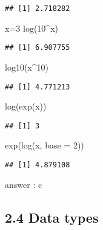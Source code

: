 \documentclass[
]{article}
\newenvironment{Shaded}{\begin{snugshade}}{\end{snugshade}}
\newcommand{\AttributeTok}[1]{\textcolor[rgb]{0.77,0.63,0.00}{#1}}
\newcommand{\DecValTok}[1]{\textcolor[rgb]{0.00,0.00,0.81}{#1}}
\newcommand{\FunctionTok}[1]{\textcolor[rgb]{0.00,0.00,0.00}{#1}}
\newcommand{\NormalTok}[1]{#1}
\newcommand{\OtherTok}[1]{\textcolor[rgb]{0.56,0.35,0.01}{#1}}
\newcommand{\SpecialCharTok}[1]{\textcolor[rgb]{0.00,0.00,0.00}{#1}}
\begin{document}
\begin{verbatim}
## [1] 2.718282
\end{verbatim}

\begin{Shaded}
\begin{Highlighting}[]
\NormalTok{x}\OtherTok{=}\DecValTok{3}
\FunctionTok{log}\NormalTok{(}\DecValTok{10}\SpecialCharTok{\^{}}\NormalTok{x)}
\end{Highlighting}
\end{Shaded}

\begin{verbatim}
## [1] 6.907755
\end{verbatim}

\begin{Shaded}
\begin{Highlighting}[]
\FunctionTok{log10}\NormalTok{(x}\SpecialCharTok{\^{}}\DecValTok{10}\NormalTok{)}
\end{Highlighting}
\end{Shaded}

\begin{verbatim}
## [1] 4.771213
\end{verbatim}

\begin{Shaded}
\begin{Highlighting}[]
\FunctionTok{log}\NormalTok{(}\FunctionTok{exp}\NormalTok{(x))}
\end{Highlighting}
\end{Shaded}

\begin{verbatim}
## [1] 3
\end{verbatim}

\begin{Shaded}
\begin{Highlighting}[]
\FunctionTok{exp}\NormalTok{(}\FunctionTok{log}\NormalTok{(x, }\AttributeTok{base =} \DecValTok{2}\NormalTok{))}
\end{Highlighting}
\end{Shaded}

\begin{verbatim}
## [1] 4.879108
\end{verbatim}

answer : c

\hypertarget{data-types}{%
\subsection{2.4 Data types}\label{data-types}}
\end{document}
